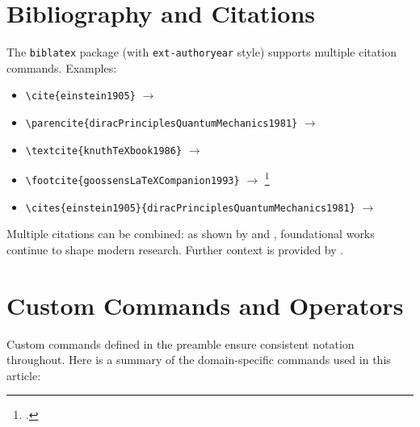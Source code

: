 \documentclass[
    language=english,
    doctype=article,
    institution=none,
    titlestyle=book,
]{../../omnilatex}
\theoremstyle{definition}
\theoremstyle{definition}
\theoremstyle{remark}
\begin{document}
\section{Bibliography and Citations}
\label{sec:bibliography}

The \texttt{biblatex} package (with \texttt{ext-authoryear} style) supports
multiple citation commands.  Examples:

\begin{itemize}
    \item \verb|\cite{einstein1905}| $\to$ \cite{einstein1905}
    \item \verb|\parencite{diracPrinciplesQuantumMechanics1981}|
          $\to$ \parencite{diracPrinciplesQuantumMechanics1981}
    \item \verb|\textcite{knuthTeXbook1986}|
          $\to$ \textcite{knuthTeXbook1986}
    \item \verb|\footcite{goossensLaTeXCompanion1993}|
          $\to$ \footcite{goossensLaTeXCompanion1993}
    \item \verb|\cites{einstein1905}{diracPrinciplesQuantumMechanics1981}|
          $\to$ \cites{einstein1905}{diracPrinciplesQuantumMechanics1981}
\end{itemize}

Multiple citations can be combined: as shown by
\textcite{einstein1905} and \textcite{knuthTeXbook1986}, foundational
works continue to shape modern research.  Further context is provided
by \parencite{baehrThermodynamikGrundlagenUnd2016,
    mollenhauerHandbuchDieselmotoren2007}.


\section{Custom Commands and Operators}
\label{sec:custom}

Custom commands defined in the preamble ensure consistent notation throughout.
Here is a summary of the domain-specific commands used in this article:
\end{document}
